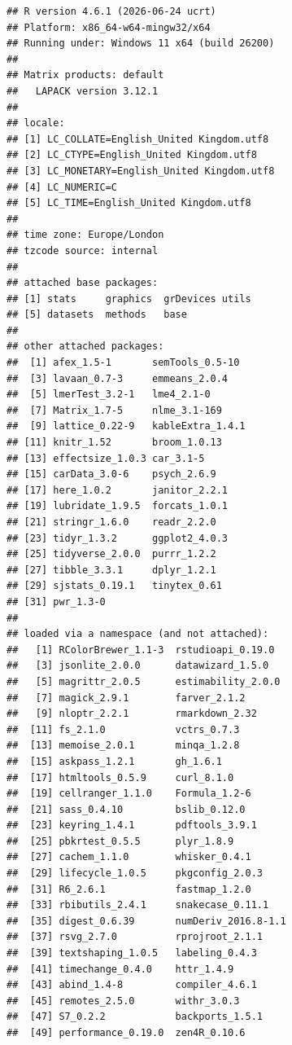 \documentclass[
]{article}
\begin{document}
\begin{verbatim}
## R version 4.6.1 (2026-06-24 ucrt)
## Platform: x86_64-w64-mingw32/x64
## Running under: Windows 11 x64 (build 26200)
## 
## Matrix products: default
##   LAPACK version 3.12.1
## 
## locale:
## [1] LC_COLLATE=English_United Kingdom.utf8 
## [2] LC_CTYPE=English_United Kingdom.utf8   
## [3] LC_MONETARY=English_United Kingdom.utf8
## [4] LC_NUMERIC=C                           
## [5] LC_TIME=English_United Kingdom.utf8    
## 
## time zone: Europe/London
## tzcode source: internal
## 
## attached base packages:
## [1] stats     graphics  grDevices utils    
## [5] datasets  methods   base     
## 
## other attached packages:
##  [1] afex_1.5-1       semTools_0.5-10 
##  [3] lavaan_0.7-3     emmeans_2.0.4   
##  [5] lmerTest_3.2-1   lme4_2.1-0      
##  [7] Matrix_1.7-5     nlme_3.1-169    
##  [9] lattice_0.22-9   kableExtra_1.4.1
## [11] knitr_1.52       broom_1.0.13    
## [13] effectsize_1.0.3 car_3.1-5       
## [15] carData_3.0-6    psych_2.6.9     
## [17] here_1.0.2       janitor_2.2.1   
## [19] lubridate_1.9.5  forcats_1.0.1   
## [21] stringr_1.6.0    readr_2.2.0     
## [23] tidyr_1.3.2      ggplot2_4.0.3   
## [25] tidyverse_2.0.0  purrr_1.2.2     
## [27] tibble_3.3.1     dplyr_1.2.1     
## [29] sjstats_0.19.1   tinytex_0.61    
## [31] pwr_1.3-0       
## 
## loaded via a namespace (and not attached):
##   [1] RColorBrewer_1.1-3  rstudioapi_0.19.0  
##   [3] jsonlite_2.0.0      datawizard_1.5.0   
##   [5] magrittr_2.0.5      estimability_2.0.0 
##   [7] magick_2.9.1        farver_2.1.2       
##   [9] nloptr_2.2.1        rmarkdown_2.32     
##  [11] fs_2.1.0            vctrs_0.7.3        
##  [13] memoise_2.0.1       minqa_1.2.8        
##  [15] askpass_1.2.1       gh_1.6.1           
##  [17] htmltools_0.5.9     curl_8.1.0         
##  [19] cellranger_1.1.0    Formula_1.2-6      
##  [21] sass_0.4.10         bslib_0.12.0       
##  [23] keyring_1.4.1       pdftools_3.9.1     
##  [25] pbkrtest_0.5.5      plyr_1.8.9         
##  [27] cachem_1.1.0        whisker_0.4.1      
##  [29] lifecycle_1.0.5     pkgconfig_2.0.3    
##  [31] R6_2.6.1            fastmap_1.2.0      
##  [33] rbibutils_2.4.1     snakecase_0.11.1   
##  [35] digest_0.6.39       numDeriv_2016.8-1.1
##  [37] rsvg_2.7.0          rprojroot_2.1.1    
##  [39] textshaping_1.0.5   labeling_0.4.3     
##  [41] timechange_0.4.0    httr_1.4.9         
##  [43] abind_1.4-8         compiler_4.6.1     
##  [45] remotes_2.5.0       withr_3.0.3        
##  [47] S7_0.2.2            backports_1.5.1    
##  [49] performance_0.19.0  zen4R_0.10.6       

\end{verbatim}
\end{document}

